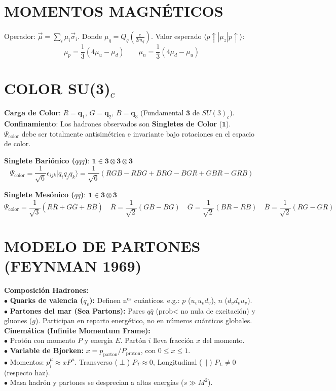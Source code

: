 \section{MOMENTOS MAGNÉTICOS}
Operador: $\vec{\mu} = \sum_i \mu_i \vec{\sigma}_i$.
Donde $\mu_q = Q_q (\frac{e}{2m_q})$.
Valor esperado $\langle p\uparrow | \mu_z | p\uparrow \rangle$:
$$ \mu_p = \frac{1}{3}(4\mu_u - \mu_d) \qquad  \mu_n = \frac{1}{3}(4\mu_d - \mu_u) $$




\section{COLOR SU(3)$_c$}
\textbf{Carga de Color}: $R= \textbf{q}_1,\,G=\textbf{q}_2, \, B = \textbf{q}_3$ (Fundamental $\mathbf{3}$ de $SU(3)_c$).\\
\textbf{Confinamiento}:
Los hadrones observados son \textbf{Singletes de Color} ($\mathbf{1}$).\\
$\Psi_{\text{color}}$ debe ser totalmente antisimétrica e invariante bajo rotaciones en el espacio de color.


\textbf{Singlete Bariónico ($qqq$)}:
$ \mathbf{1} \in \mathbf{3} \otimes \mathbf{3} \otimes \mathbf{3} $
$$ \Psi_{\text{color}} = \frac{1}{\sqrt{6}} \epsilon_{ijk} |q_i q_j q_k\rangle = \frac{1}{\sqrt{6}}(RGB - RBG + BRG - BGR + GBR - GRB) $$

\textbf{Singlete Mesónico ($q\bar{q}$)}:
$ \mathbf{1} \in \mathbf{3} \otimes \mathbf{\bar{3}} $
$$ \Psi_{\text{color}} \!=\! \frac{1}{\sqrt{3}} (R\bar{R} + G\bar{G} + B\bar{B}) \quad \bar{R}= \frac{1}{\sqrt{2}} (GB-BG)\quad \bar{G} =  \frac{1}{\sqrt{2}} (BR-RB)\quad  \bar{B} = \frac{1}{\sqrt{2}} (RG-GR)$$


\section{MODELO DE PARTONES (FEYNMAN 1969)}
\textbf{Composición Hadrones:}\\
$\bullet$ \textbf{Quarks de valencia ($q_v$):} Definen n$^\text{os}$ cuánticos. e.g.: $p$ ($u_v u_v d_v$), $n$ ($d_v d_v u_v$).\\
$\bullet$ \textbf{Partones del mar (Sea Partons):} Pares $q\bar{q}$ (prob< no nula de excitación) y gluones ($g$). Participan en reparto energético, no en números cuánticos globales. \\

\textbf{Cinemática (Infinite Momentum Frame):}\\
$\bullet$ Protón con momento $P$ y energía $E$. Partón $i$ lleva fracción $x$ del momento. \\
$\bullet$ \textbf{Variable de Bjorken:} $x = p_{\text{parton}}/P_{\text{proton}}$, con $0 \le x \le 1$. \\
$\bullet$ Momentos: $p_i^\mu \approx x P^\mu$. Transverso ($\perp$) $P_T \approx 0$, Longitudinal ($\parallel$) $P_L \neq0$ (respecto haz). \\
$\bullet$ Masa hadrón y partones se desprecian a altas energías ($s \gg M^2$).

